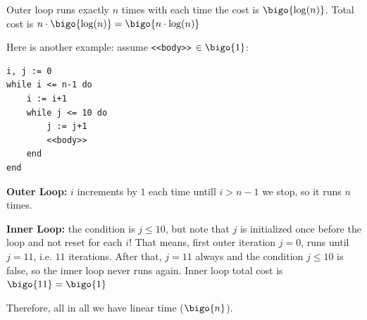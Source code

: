 Outer loop runs exactly $n$ times with each time the cost is $\bigo{\operatorname{log}(n)}$. Total cost is $n \cdot \bigo{\operatorname{log}(n)} = \bigo{n \cdot \operatorname{log}(n)}$

Here is another example: assume \texttt{<<body>>} $\in \bigo{1}$:
\begin{verbatim}
i, j := 0
while i <= n-1 do
    i := i+1
    while j <= 10 do
        j := j+1
        <<body>>
    end
end
\end{verbatim} 
\textbf{Outer Loop: }$i$ increments by $1$ each time untill $i > n - 1$ we stop, so it runs $n$ times.

\textbf{Inner Loop: }the condition is $j \leq 10$, but note that $j$ is initialized once before the loop and not reset for each $i$! That means, first outer iteration $j=0$, runs until $j = 11$, i.e. $11$ iterations. After that, $j=11$ always and the condition $j \leq 10$ is false, so the inner loop never runs again. Inner loop total cost is $\bigo{11} = \bigo{1}$

Therefore, all in all we have linear time ($\bigo{n}$).

